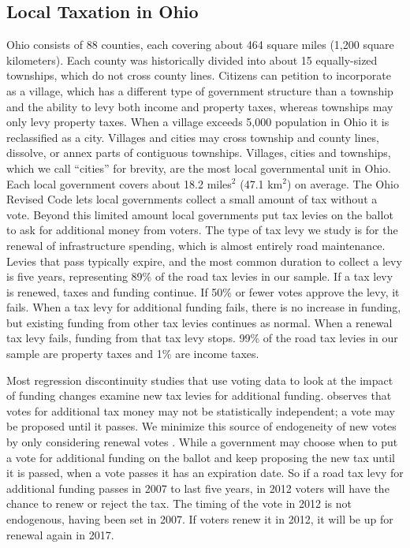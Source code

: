 \subsection{Local Taxation in Ohio}

Ohio consists of 88 counties, each covering about 464 square miles (1,200 square kilometers).  Each county was historically divided into about 15 equally-sized townships, which do not cross county lines.  Citizens can petition to incorporate as a village, which has a different type of government structure than a township and the ability to levy both income and property taxes, whereas townships may only levy property taxes.  When a village exceeds 5,000 population in Ohio it is reclassified as a city.  Villages and cities may cross township and county lines, dissolve, or annex parts of contiguous townships.  Villages, cities and townships, which we call “cities” for brevity, are the most local governmental unit in Ohio. Each local government covers about 18.2 miles$^2$ (47.1 km$^2$) on average. The Ohio Revised Code lets local governments collect a small amount of tax without a vote.  Beyond this limited amount local governments put tax levies on the ballot to ask for additional money from voters.  
The type of tax levy we study is for the renewal of infrastructure spending, which is almost entirely road maintenance.  Levies that pass typically expire, and the most common duration to collect a levy is five years, representing 89\% of the road tax levies in our sample.  If a tax levy is renewed, taxes and funding continue.  If 50\% or fewer votes approve the levy, it fails.  When a tax levy for additional funding fails, there is no increase in funding, but existing funding from other tax levies continues as normal.  When a renewal tax levy fails, funding from that tax levy stops.  99\% of the road tax levies in our sample are property taxes and 1\% are income taxes.

Most regression discontinuity studies that use voting data to look at the impact of funding changes examine new tax levies for additional funding.  \cite{cellini2010value} observes that votes for additional tax money may not be statistically independent; a vote may be proposed until it passes.  We minimize this source of endogeneity of new votes by only considering renewal votes \citep{brasington2017school}.  While a government may choose when to put a vote for additional funding on the ballot and keep proposing the new tax until it is passed, when a vote passes it has an expiration date.  So if a road tax levy for additional funding passes in 2007 to last five years, in 2012 voters will have the chance to renew or reject the tax.  The timing of the vote in 2012 is not endogenous, having been set in 2007.  If voters renew it in 2012, it will be up for renewal again in 2017. 

